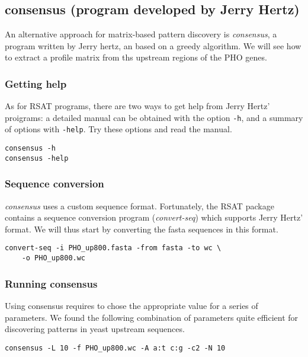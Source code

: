 \subsection{consensus (program developed by Jerry Hertz)}

An alternative approach for matrix-based pattern discovery is
\textit{consensus}, a program written by Jerry hertz, an based on a
greedy algorithm. We will see how to extract a profile matrix from ths
upstream regions of the PHO genes.

\subsubsection{Getting help}

As for RSAT programs, there are two ways to get help from Jerry Hertz'
proigrams: a detailed manual can be obtained with the option
\texttt{-h}, and a summary of options with \texttt{-help}. Try these
options and read the manual.

\begin{verbatim}
consensus -h
consensus -help
\end{verbatim}

\subsubsection{Sequence conversion}


\textit{consensus} uses a custom sequence format. Fortunately, the RSAT
package contains a sequence conversion program (\textit{convert-seq})
which supports Jerry Hertz' format. We will thus start by converting
the fasta sequences in this format. 

\begin{verbatim}
convert-seq -i PHO_up800.fasta -from fasta -to wc \ 
    -o PHO_up800.wc
\end{verbatim}

\subsubsection{Running consensus}

Using consensus requires to chose the appropriate value for a series
of parameters. We found the following combination of parameters quite
efficient for discovering patterns in yeast upstream sequences.

\begin{verbatim}
consensus -L 10 -f PHO_up800.wc -A a:t c:g -c2 -N 10
\end{verbatim}

